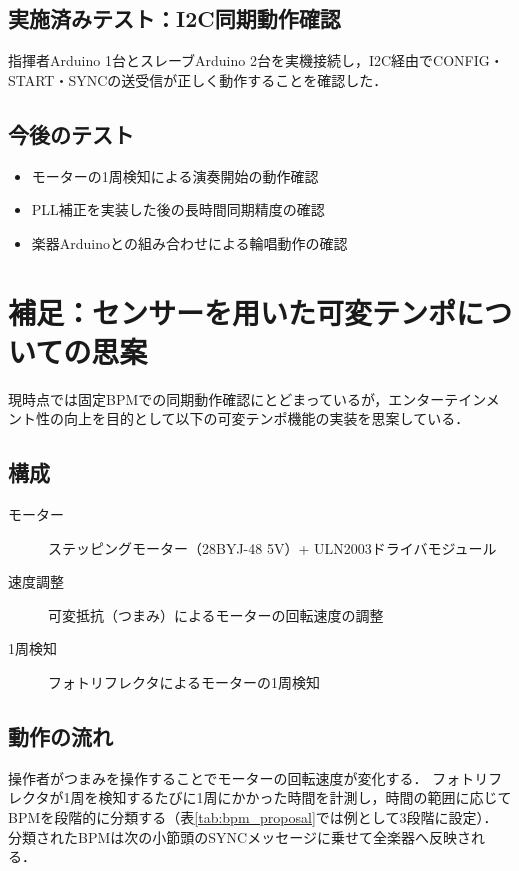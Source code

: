 \documentclass[uplatex,dvipdfmx,report]{jlreq}
\begin{document}
\subsection{実施済みテスト：I2C同期動作確認}

指揮者Arduino 1台とスレーブArduino 2台を実機接続し，I2C経由でCONFIG・START・SYNCの送受信が正しく動作することを確認した．

\subsection{今後のテスト}

\begin{itemize}
  \item モーターの1周検知による演奏開始の動作確認
  \item PLL補正を実装した後の長時間同期精度の確認
  \item 楽器Arduinoとの組み合わせによる輪唱動作の確認
\end{itemize}



\section{補足：センサーを用いた可変テンポについての思案}

現時点では固定BPMでの同期動作確認にとどまっているが，エンターテインメント性の向上を目的として以下の可変テンポ機能の実装を思案している．

\subsection{構成}

\begin{description}
  \item[モーター] ステッピングモーター（28BYJ-48 5V）+ ULN2003ドライバモジュール
  \item[速度調整] 可変抵抗（つまみ）によるモーターの回転速度の調整
  \item[1周検知] フォトリフレクタによるモーターの1周検知
\end{description}

\subsection{動作の流れ}

操作者がつまみを操作することでモーターの回転速度が変化する．
フォトリフレクタが1周を検知するたびに1周にかかった時間を計測し，時間の範囲に応じてBPMを段階的に分類する（表\ref{tab:bpm_proposal}では例として3段階に設定）．
分類されたBPMは次の小節頭のSYNCメッセージに乗せて全楽器へ反映される．
\end{document}
